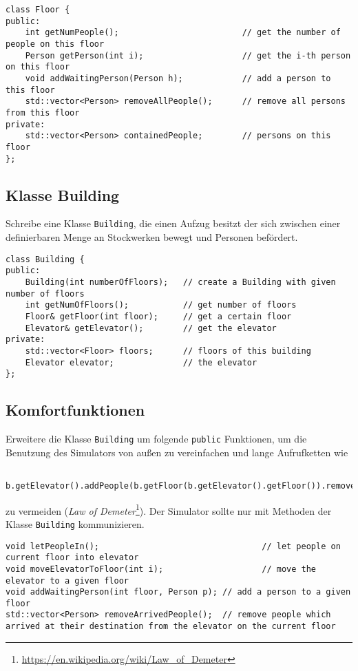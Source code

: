 \begin{lstlisting}
class Floor {
public:
    int getNumPeople();                         // get the number of people on this floor
    Person getPerson(int i);                    // get the i-th person on this floor
    void addWaitingPerson(Person h);            // add a person to this floor
    std::vector<Person> removeAllPeople();      // remove all persons from this floor
private:
    std::vector<Person> containedPeople;        // persons on this floor
};
\end{lstlisting}

\subsection{Klasse Building}
Schreibe eine Klasse \lstinline{Building}, die einen Aufzug besitzt der sich zwischen einer definierbaren Menge an Stockwerken bewegt und Personen befördert.

\begin{lstlisting}
class Building {
public:
    Building(int numberOfFloors);   // create a Building with given number of floors
    int getNumOfFloors();           // get number of floors
    Floor& getFloor(int floor);     // get a certain floor
    Elevator& getElevator();        // get the elevator
private:
    std::vector<Floor> floors;      // floors of this building
    Elevator elevator;              // the elevator
};
\end{lstlisting}


\subsection{Komfortfunktionen}
Erweitere die Klasse \lstinline{Building} um folgende \lstinline{public} Funktionen, um die Benutzung des Simulators von außen zu vereinfachen und lange Aufrufketten wie
\begin{lstlisting}
    b.getElevator().addPeople(b.getFloor(b.getElevator().getFloor()).removeAllPeople());
\end{lstlisting}

zu vermeiden (\emph{Law of Demeter}\footnote{\url{https://en.wikipedia.org/wiki/Law_of_Demeter}}).
Der Simulator sollte nur mit Methoden der Klasse \lstinline{Building} kommunizieren.

\begin{lstlisting}
void letPeopleIn();                                 // let people on current floor into elevator
void moveElevatorToFloor(int i);                    // move the elevator to a given floor
void addWaitingPerson(int floor, Person p); // add a person to a given floor
std::vector<Person> removeArrivedPeople();  // remove people which arrived at their destination from the elevator on the current floor
\end{lstlisting}

